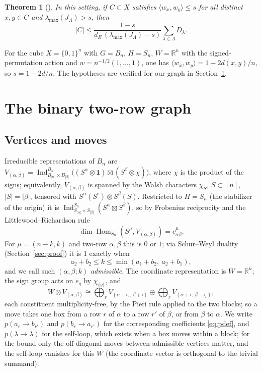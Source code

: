 \documentclass[11pt]{amsart}
\newtheorem{theorem}{Theorem}[section]
\theoremstyle{definition}
\newcommand{\R}{\mathbb R}
\newcommand{\Hom}{\operatorname{Hom}}
\newcommand{\Ind}{\operatorname{Ind}}
\begin{document}
\begin{theorem}[{\cite[Thm.~4.2]{OAI2026}}]\label{thm:proj}
In this setting, if $C\subset X$ satisfies $\langle w_x,w_y\rangle\le s$ for all distinct $x,y\in C$ and $\lambda_{\max}(J_\Lambda)>s$, then
\[
|C|\le\frac{1-s}{d_E\,(\lambda_{\max}(J_\Lambda)-s)}\sum_{\lambda\in\Lambda}D_\lambda .
\]
\end{theorem}

For the cube $X=\{0,1\}^n$ with $G=B_n$, $H=S_n$, $W=\R^n$ with the signed-permutation action and $w=n^{-1/2}(1,\dots,1)$, one has $\langle w_x,w_y\rangle=1-2d(x,y)/n$, so $s=1-2d/n$. The hypotheses are verified for our graph in Section~\ref{sec:graph}.

\section{The binary two-row graph}\label{sec:graph}

\subsection{Vertices and moves}
Irreducible representations of $B_n$ are $V_{(\alpha,\beta)}=\Ind_{B_{|\alpha|}\times B_{|\beta|}}^{B_n}\big((S^\alpha\otimes\mathbf1)\boxtimes(S^\beta\otimes\chi)\big)$, where $\chi$ is the product of the signs; equivalently, $V_{(\alpha,\beta)}$ is spanned by the Walsh characters $\chi_S$, $S\subset[n]$, $|S|=|\beta|$, tensored with $S^\alpha(S^c)\otimes S^\beta(S)$. Restricted to $H=S_n$ (the stabilizer of the origin) it is $\Ind_{S_{|\alpha|}\times S_{|\beta|}}^{S_n}(S^\alpha\boxtimes S^\beta)$, so by Frobenius reciprocity and the Littlewood--Richardson rule
\[
\dim\Hom_{S_n}(S^\mu,V_{(\alpha,\beta)})=c^\mu_{\alpha\beta}.
\]
For $\mu=(n-k,k)$ and two-row $\alpha,\beta$ this is $0$ or $1$; via Schur--Weyl duality (Section~\ref{sec:proof}) it is $1$ exactly when
\begin{equation}\label{eq:adm}
a_2+b_2\le k\le\min(a_1+b_2,\ a_2+b_1),
\end{equation}
and we call such $(\alpha,\beta;k)$ \emph{admissible}. The coordinate representation is $W=\R^n$; the sign group acts on $e_q$ by $\chi_{\{q\}}$, and
\[
W\otimes V_{(\alpha,\beta)}\cong\bigoplus_{r}V_{(\alpha-\square_r,\ \beta+\square)}\oplus\bigoplus_rV_{(\alpha+\square,\ \beta-\square_r)},
\]
each constituent multiplicity-free, by the Pieri rule applied to the two blocks; so a move takes one box from a row $r$ of $\alpha$ to a row $r'$ of $\beta$, or from $\beta$ to $\alpha$. We write $p(a_r\to b_{r'})$ and $p(b_r\to a_{r'})$ for the corresponding coefficients \eqref{eq:pdef}, and $p(\lambda\to\lambda)$ for the self-loop, which exists when a box moves within a block; for the bound only the off-diagonal moves between admissible vertices matter, and the self-loop vanishes for this $W$ (the coordinate vector is orthogonal to the trivial summand).
\end{document}
